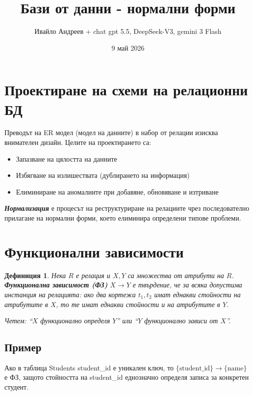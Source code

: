 \documentclass{scrartcl}
\title{Бази от данни - нормални форми}
\author{Ивайло Андреев + chat gpt 5.5, DeepSeek-V3, gemini 3 Flash}
\date{9 май 2026}
\newtheorem{definition}{Дефиниция}
\begin{document}
\maketitle

\tableofcontents
\newpage

\begin{FlushLeft}

\section{Проектиране на схеми на релационни БД}

Преводът на ER модел (модел на данните) в набор от релации изисква внимателен дизайн. Целите на проектирането са:

\begin{itemize}
    \item Запазване на цялостта на данните
    \item Избягване на излишествата (дублирането на информация)
    \item Елиминиране на аномалиите при добавяне, обновяване и изтриване
\end{itemize}

\textbf{\textit{Нормализация}} е процесът на реструктуриране на релациите чрез последователно прилагане на нормални форми, което елиминира определени типове проблеми.

\section{Функционални зависимости}

\begin{definition}
Нека $R$ е релация и $X, Y$ са множества от атрибути на $R$. \textbf{\textit{Функционална зависимост (ФЗ)}} $X \rightarrow Y$ е твърдение, че за всяка допустима инстанция на релацията: ако два кортежа $t_1, t_2$ имат еднакви стойности на атрибутите в $X$, то те имат еднакви стойности и на атрибутите в $Y$.

Четем: ``$X$ функционално определя $Y$'' или ``$Y$ функционално зависи от $X$''.
\end{definition}

\subsection{Пример}

Ако в таблица Students student\_id е уникален ключ, то $\{\text{student\_id}\} \rightarrow \{\text{name}\}$ е ФЗ, защото стойността на student\_id еднозначно определя записа за конкретен студент.


\end{FlushLeft}
\end{document}
